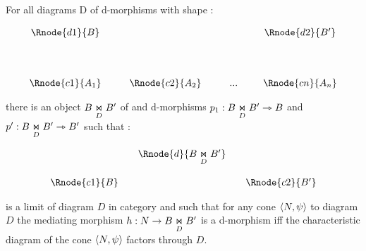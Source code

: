 \documentclass[10pt,a4paper]{scrartcl}
\begin{document}
\begin{lemma}
For all diagrams D of d-morphisms with shape \ndidly:
	
\begin{center}
\begin{displaymath}
\begin{array}{cp{0.3cm}c         p{0.3cm}  c p{0.2cm} c}
\Rnode{d1}{B}& &               & &     & &\Rnode{d2}{B'}  \\ [1.4cm]
\Rnode{c1}{A_1}& &\Rnode{c2}{A_2}& & ... & &\Rnode{cn}{A_n}
\end{array}
\end{displaymath}
\end{center}

there is an object  $ \fibrex{B}{B'}{D}$ of  and d-morphisms 
$p_1: \fibrex{B}{B'}{D} \smorph B$ and  $p': \fibrex{B}{B'}{D} \smorph B'$ such that :

\begin{center}
\begin{displaymath}
\begin{array}{cp{0cm}cp{0cm} c}
            & &\Rnode{d}{\fibrex{B}{B'}{D}}                  \\ [0.6cm]
\Rnode{c1}{B}& &                & & \Rnode{c2}{B'} 
\end{array}
\end{displaymath}
\end{center}

is a limit of diagram $D$ in category  and such that for any cone $\tuple{N,\psi}$ to diagram $D$
the mediating morphism $h: N \morph B \underset{D}{\Join} B'$ is a d-morphism iff 
the characteristic diagram of the cone $\tuple{N,\psi}$ factors through $D$.

\end{lemma}
\end{document}
